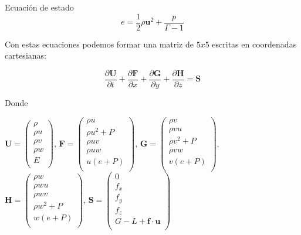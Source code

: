 \documentclass[12pt,a4paper]{book}
\begin{document}
Ecuación de estado
\begin{equation}
e=\frac{1}{2} \rho \mathbf{u}^{2} + \frac{p}{\Gamma - 1}
\end{equation}

Con estas ecuaciones podemos formar una matriz de $5x5$ escritas en coordenadas cartesianas:

\begin{equation} \label{euler_cartesianas}
\dfrac{\partial \mathbf{U}}{\partial t}+\dfrac{\partial \mathbf{F}}{\partial x}+\dfrac{\partial \mathbf{G}}{\partial y}+\dfrac{\partial \mathbf{H}}{\partial z}= \mathbf{S}
\end{equation}

Donde
\begin{center}


$\mathbf{U}=
\left(\begin{smallmatrix}
\rho \\
\rho u \\
\rho v \\
\rho w \\
E \\
\end{smallmatrix}\right)
$,
$\mathbf{F} =
\left(\begin{smallmatrix}
\rho u \\
\rho u^{2}+P \\
\rho uv \\
\rho uw \\
u(e+P) \\
\end{smallmatrix}\right)
$,
$\mathbf{G} =
\left(\begin{smallmatrix}
\rho v\\
\rho vu \\
\rho v^{2}+P \\
\rho vw \\
v(e+P) \\
\end{smallmatrix}\right)
$,
$\mathbf{H} =
\left(\begin{smallmatrix}
\rho w\\
\rho wu \\
\rho wv \\
\rho w^{2}+P \\
w(e+P) \\
\end{smallmatrix}\right)
$, 
$\mathbf{S} =
\left(\begin{smallmatrix}
0 \\
f_{x} \\
f_{y} \\
f_{z} \\
G-L+\textbf{f} \cdot \textbf{u} \\
\end{smallmatrix}\right)
$
\end{center}
\end{document}
